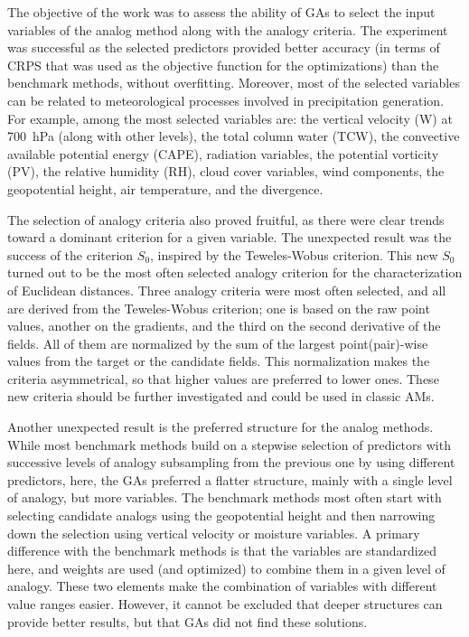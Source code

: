 \documentclass[draft]{agujournal2019}
\begin{document}
The objective of the work was to assess the ability of GAs to select the input variables of the analog method along with the analogy criteria. The experiment was successful as the selected predictors provided better accuracy (in terms of CRPS that was used as the objective function for the optimizations) than the benchmark methods, without overfitting. Moreover, most of the selected variables can be related to meteorological processes involved in precipitation generation. For example, among the most selected variables are: the vertical velocity (W) at 700~hPa (along with other levels), the total column water (TCW), the convective available potential energy (CAPE), radiation variables, the potential vorticity (PV), the relative humidity (RH), cloud cover variables, wind components, the geopotential height, air temperature, and the divergence.

The selection of analogy criteria also proved fruitful, as there were clear trends toward a dominant criterion for a given variable. The unexpected result was the success of the criterion $S_{0}$, inspired by the Teweles-Wobus criterion. This new $S_{0}$ turned out to be the most often selected analogy criterion for the characterization of Euclidean distances. Three analogy criteria were most often selected, and all are derived from the Teweles-Wobus criterion; one is based on the raw point values, another on the gradients, and the third on the second derivative of the fields. All of them are normalized by the sum of the largest point(pair)-wise values from the target or the candidate fields. This normalization makes the criteria asymmetrical, so that higher values are preferred to lower ones. These new criteria should be further investigated and could be used in classic AMs.

Another unexpected result is the preferred structure for the analog methods. While most benchmark methods build on a stepwise selection of predictors with successive levels of analogy subsampling from the previous one by using different predictors, here, the GAs preferred a flatter structure, mainly with a single level of analogy, but more variables. The benchmark methods most often start with selecting candidate analogs using the geopotential height and then narrowing down the selection using vertical velocity or moisture variables. A primary difference with the benchmark methods is that the variables are standardized here, and weights are used (and optimized) to combine them in a given level of analogy. These two elements make the combination of variables with different value ranges easier. However, it cannot be excluded that deeper structures can provide better results, but that GAs did not find these solutions.
\end{document}
